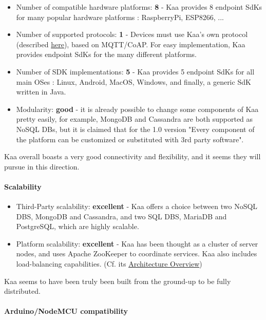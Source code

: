 \documentclass{article}
\begin{document}
\begin{itemize}
\item Number of compatible hardware platforms: \textbf{8} - Kaa provides 8 endpoint SdKs for many popular hardware platforms : RaspberryPi, ESP8266, ...
\item Number of supported protocols: \textbf{1} - Devices must use Kaa's own protocol (described \href{https://github.com/kaaproject/kaa-rfcs/}{here}), based on MQTT/CoAP. For easy implementation, Kaa provides endpoint SdKs for the many different platforms.
\item Number of SDK implementations: \textbf{5} - Kaa provides 5 endpoint SdKs for all main OSes : Linux, Android, MacOS, Windows, and finally, a generic SdK written in Java.
\item Modularity: \textbf{good} - it is already possible to change some components of Kaa pretty easily, for example, MongoDB and Cassandra are both supported as NoSQL DBs, but it is claimed that for the 1.0 version "Every component of the platform can be customized or substituted with 3rd party software".
\end{itemize}

Kaa overall boasts a very good connectivity and flexibility, and it seems they will pursue in this direction.

\paragraph{Scalability}

\begin{itemize}
\item Third-Party scalability: \textbf{excellent} - Kaa offers a choice between two NoSQL DBS, MongoDB and Cassandra, and two SQL DBS, MariaDB and PostgreSQL, which are highly scalable.
\item Platform scalability: \textbf{excellent} - Kaa has been thought as a cluster of server nodes, and uses Apache ZooKeeper to coordinate services. Kaa also includes load-balancing capabilities. (Cf. its \href{https://kaaproject.github.io/kaa/docs/v0.10.0/Architecture-overview/}{Architecture Overview})
\end{itemize}

Kaa seems to have been truly been built from the ground-up to be fully distributed.

\paragraph{Arduino/NodeMCU compatibility}
\end{document}
